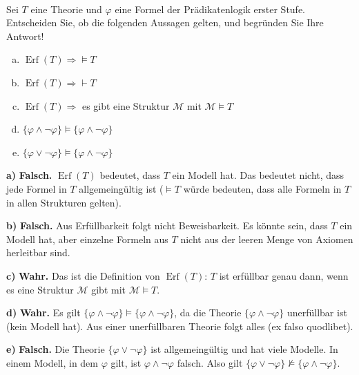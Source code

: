 \\
Sei $T$ eine Theorie und $\varphi$ eine Formel der Prädikatenlogik erster Stufe. Entscheiden Sie, ob die folgenden Aussagen gelten, und begründen Sie Ihre Antwort!
\begin{enumerate}[a)]
  \item $\operatorname{Erf}(T) \Rightarrow \models T$
  \item $\operatorname{Erf}(T) \Rightarrow \vdash T$
  \item $\operatorname{Erf}(T) \Rightarrow$ es gibt eine Struktur $\mathcal{M}$ mit $\mathcal{M} \models T$
  \item $\{\varphi \wedge \neg\varphi\} \models \{\varphi \wedge \neg\varphi\}$
  \item $\{\varphi \vee \neg\varphi\} \models \{\varphi \wedge \neg\varphi\}$
\end{enumerate}

\begin{loesung}
\textbf{a)} \textbf{Falsch.} $\operatorname{Erf}(T)$ bedeutet, dass $T$ ein Modell hat. Das bedeutet nicht, dass jede Formel in $T$ allgemeingültig ist ($\models T$ würde bedeuten, dass alle Formeln in $T$ in allen Strukturen gelten).

\textbf{b)} \textbf{Falsch.} Aus Erfüllbarkeit folgt nicht Beweisbarkeit. Es könnte sein, dass $T$ ein Modell hat, aber einzelne Formeln aus $T$ nicht aus der leeren Menge von Axiomen herleitbar sind.

\textbf{c)} \textbf{Wahr.} Das ist die Definition von $\operatorname{Erf}(T)$: $T$ ist erfüllbar genau dann, wenn es eine Struktur $\mathcal{M}$ gibt mit $\mathcal{M}\models T$.

\textbf{d)} \textbf{Wahr.} Es gilt $\{\varphi\wedge\neg\varphi\}\models\{\varphi\wedge\neg\varphi\}$, da die Theorie $\{\varphi\wedge\neg\varphi\}$ unerfüllbar ist (kein Modell hat). Aus einer unerfüllbaren Theorie folgt alles (ex falso quodlibet).

\textbf{e)} \textbf{Falsch.} Die Theorie $\{\varphi\vee\neg\varphi\}$ ist allgemeingültig und hat viele Modelle. In einem Modell, in dem $\varphi$ gilt, ist $\varphi\wedge\neg\varphi$ falsch. Also gilt $\{\varphi\vee\neg\varphi\}\not\models\{\varphi\wedge\neg\varphi\}$.
\end{loesung}


